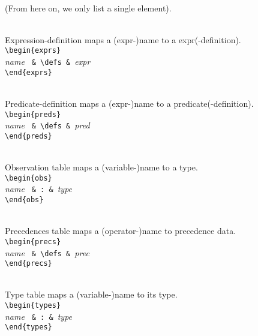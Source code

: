 \begin{description}
        \\(From here on, we only list a single element).
  \item[\texttt{exprs :: Trie Expr}]~\\
    Expression-definition maps a (expr-)name to a expr(-definition).
    \\\verb"\begin{exprs}"
    \\ \phantom{mm}\textit{\textsf{name}} \verb" & \defs & "\textit{\textsf{expr}}
    \\\verb"\end{exprs}"
  \item[\texttt{preds :: Trie Pred}]~\\
    Predicate-definition maps a (expr-)name to a predicate(-definition).
    \\\verb"\begin{preds}"
    \\ \phantom{mm}\textit{\textsf{name}} \verb" & \defs & "\textit{\textsf{pred}}
    \\\verb"\end{preds}"
  \item[\texttt{obs :: Trie Type}]~\\
    Observation table maps a (variable-)name to a type.
    \\\verb"\begin{obs}"
    \\ \phantom{mm}\textit{\textsf{name}} \verb" & : & "\textit{\textsf{type}}
    \\\verb"\end{obs}"
  \item[\texttt{precs :: Trie Precs}]~\\
    Precedences table maps a (operator-)name to precedence data.
    \\\verb"\begin{precs}"
    \\ \phantom{mm}\textit{\textsf{name}} \verb" & \defs & "\textit{\textsf{prec}}
    \\\verb"\end{precs}"
  \item[\texttt{types :: Trie Type}]~\\
    Type table maps a (variable-)name to its type.
    \\\verb"\begin{types}"
    \\ \phantom{mm}\textit{\textsf{name}} \verb" & : & "\textit{\textsf{type}}
    \\\verb"\end{types}"

\end{description}
